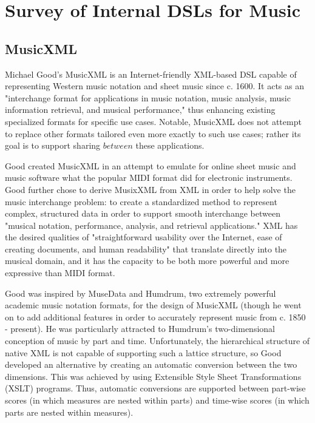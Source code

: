 \documentclass{report}
\begin{document}
\section{Survey of Internal DSLs for Music}
\label{sec:internal}

\subsection{MusicXML}
Michael Good's MusicXML is an Internet-friendly XML-based DSL capable of representing Western music notation and sheet music since c. 1600. It acts as an "interchange format for applications in music notation, music analysis, music information retrieval, and musical performance," thus enhancing existing specialized formats for specific use cases. Notable, MusicXML does not attempt to replace other formats tailored even more exactly to such use cases; rather its goal is to support sharing $between$ these applications. \cite{good_2013}

Good created MusicXML in an attempt to emulate for online sheet music and music software what the popular MIDI format did for electronic instruments. Good further chose to derive MusixXML from XML in order to help solve the music interchange problem: to create a standardized method to represent complex, structured data in order to support smooth interchange between "musical notation, performance, analysis, and retrieval applications." XML has the desired qualities of "straightforward usability over the Internet, ease of creating documents, and human readability" that translate directly into the musical domain, and it has the capacity to be both more powerful and more expressive than MIDI format. \cite{good_2001}

Good was inspired by MuseData and Humdrum, two extremely powerful academic music notation formats, for the design of MusicXML (though he went on to add additional features in order to accurately represent music from c. 1850 - present). He was particularly attracted to Humdrum's two-dimensional conception of music by part and time. Unfortunately, the hierarchical structure of native XML is not capable of supporting such a lattice structure, so Good developed an alternative by creating an automatic conversion between the two dimensions. This was achieved by using Extensible Style Sheet Transformations (XSLT) programs. Thus, automatic conversions are supported between part-wise scores (in which measures are nested within parts) and time-wise scores (in which parts are nested within measures). \cite{good_2013}
\end{document}
